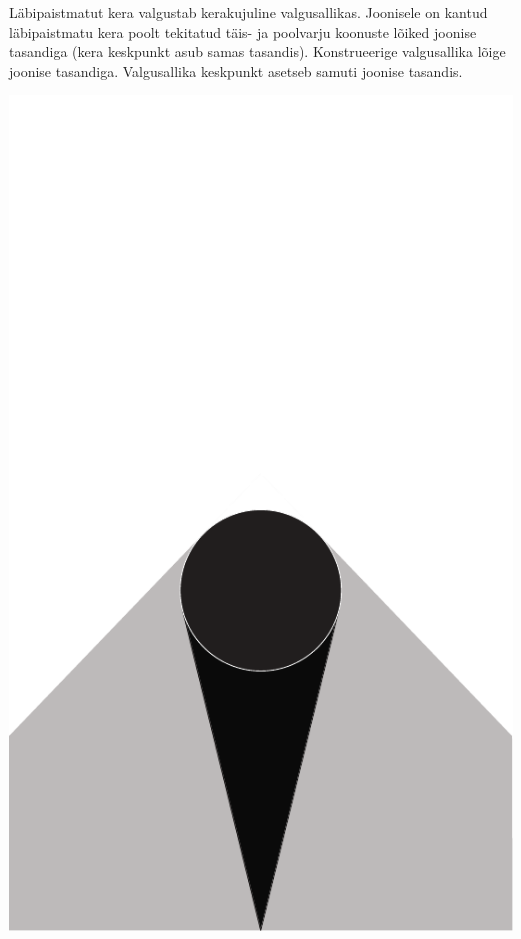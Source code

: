 \documentclass[10pt]{article}
\begin{document}
{%

Läbipaistmatut kera valgustab kerakujuline valgusallikas. Joonisele on kantud läbipaistmatu kera poolt tekitatud täis- ja poolvarju koonuste lõiked joonise tasandiga (kera keskpunkt asub samas tasandis). Konstrueerige valgusallika lõige joonise tasandiga. Valgusallika keskpunkt asetseb samuti joonise tasandis.

\begin{center}
	\includegraphics[height=0.8\textheight]{2007-v2g-06-yl}
\end{center}
\probend
\bigskip

}
\end{document}
